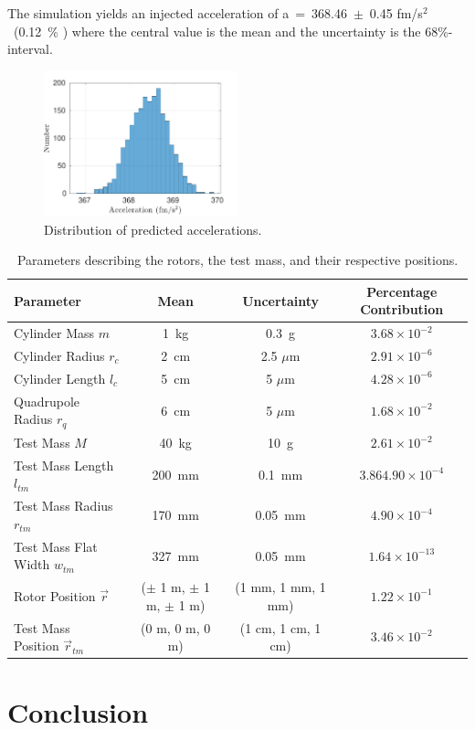 \documentclass[twocolumn]{revtex4-1}
\begin{document}
The simulation yields an injected acceleration of a~=~368.46~$\pm$~0.45 fm/s$^2$~(0.12~\% ) where the central value is the mean and the uncertainty is the 68\%-interval.


\begin{figure}[!h]
\centering \includegraphics[width=0.5\textwidth]{Super8_Dist.pdf}
\caption{Distribution of predicted accelerations.}
\label{dist} 
\end{figure}


\begin{widetext}
\begingroup
\setlength{\tabcolsep}{10pt} %
\renewcommand{\arraystretch}{1.5} %

\begin{table}[h!]
\begin{center}
\begin{tabular}{ |l|c|c|c| }
\hline
 Parameter & Mean & Uncertainty & Percentage Contribution\\
 \hline
Cylinder Mass $m$ & 1~kg & 0.3~g & $3.68\times10^{-2}$\\
Cylinder Radius $r_c$& 2~cm & 2.5 $\mu$m & $2.91\times10^{-6}$\\
Cylinder Length $l_c$& 5~cm & 5 $\mu$m & $4.28\times10^{-6}$\\
Quadrupole Radius $r_{q}$ & 6~cm & 5 $\mu$m &$1.68\times10^{-2}$\\
Test Mass $M$ & 40~kg & 10~g & $2.61\times10^{-2}$\\
Test Mass Length $l_{tm}$& 200~mm & 0.1~mm& $3.864.90\times10^{-4}$\\
Test Mass Radius $r_{tm}$& 170~mm & 0.05~mm& $4.90\times10^{-4}$\\
Test Mass Flat Width $w_{tm}$& 327~mm & 0.05~mm&$1.64\times10^{-13}$\\
Rotor Position $\vec{r}$& ($\pm$ 1 m, $\pm$ 1 m, $\pm$ 1 m) & (1 mm, 1 mm, 1 mm) &$1.22\times10^{-1}$\\
Test Mass Position $\vec{r}_{tm}$& (0 m, 0 m, 0 m) & (1 cm, 1 cm, 1 cm) &$3.46\times10^{-2}$\\
 \hline

 \end{tabular}
 \caption{Parameters describing the rotors, the test mass, and their respective positions.}\label{param}
 \end{center}

\end{table}
\endgroup
\end{widetext}

\section{Conclusion}



\begin{acknowledgements}

\end{acknowledgements}


 

\end{document}
